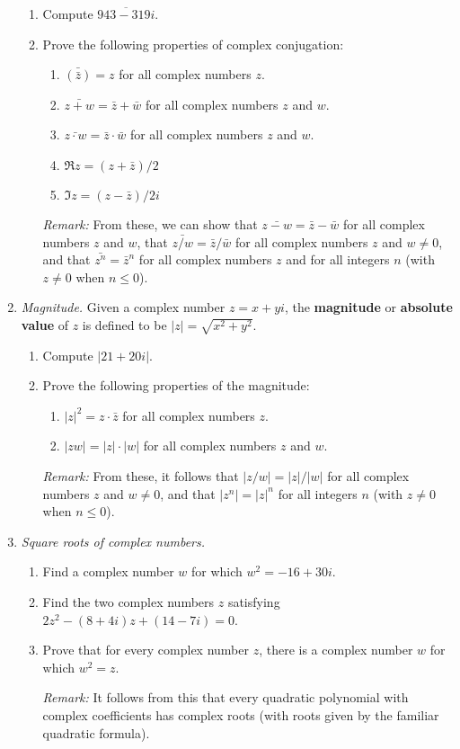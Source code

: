 \begin{enumerate}
\begin{enumerate}
\item Compute $\overline{943 - 319i}$.
\item Prove the following properties of complex conjugation:
\begin{enumerate}
\item $\bar{(\bar{z})} = z$ for all complex numbers $z$.
\item $\bar{z + w} = \bar{z} + \bar{w}$ for all complex numbers $z$ and $w$.
\item $\bar{z\cdot w} = \bar{z}\cdot\bar{w}$ for all complex numbers $z$ and $w$.
\item $\Re z = (z + \bar{z})/2$
\item $\Im z = (z - \bar{z})/2i$
\end{enumerate}
\emph{Remark:} From these, we can show that $\bar{z - w} = \bar{z} - \bar{w}$ for all complex numbers $z$ and $w$, that $\bar{z/w} = \bar{z}/\bar{w}$ for all complex numbers $z$ and $w\neq 0$, and that $\bar{z^n} = \bar{z}^n$ for all complex numbers $z$ and for all integers $n$ (with $z\neq 0$ when $n\leq 0$).
\end{enumerate}
\item \emph{Magnitude.} Given a complex number $z = x + yi$, the \textbf{magnitude} or \textbf{absolute value} of $z$ is defined to be $\lvert z\rvert = \sqrt{x^2 + y^2}$.
\begin{enumerate}
\item Compute $\lvert 21 + 20i\rvert$.
\item Prove the following properties of the magnitude:
\begin{enumerate}
\item $\lvert z\rvert^2 = z\cdot\bar{z}$ for all complex numbers $z$.
\item $\lvert zw\rvert = \lvert z\rvert\cdot\lvert w\rvert$ for all complex numbers $z$ and $w$.
\end{enumerate}
\emph{Remark:} From these, it follows that $\lvert z/w\rvert = \lvert z\rvert / \lvert w\rvert$ for all complex numbers $z$ and $w\neq 0$, and that $\lvert z^n\rvert = \lvert z\rvert^n$ for all integers $n$ (with $z\neq 0$ when $n\leq 0$).
\end{enumerate}
\item \emph{Square roots of complex numbers.}
\begin{enumerate}
\item Find a complex number $w$ for which $w^2 = -16 + 30i$.
\item Find the two complex numbers $z$ satisfying $2z^2 - (8 + 4i)z + (14 - 7i) = 0$.
\item Prove that for every complex number $z$, there is a complex number $w$ for which $w^2 = z$.\par
\emph{Remark:} It follows from this that every quadratic polynomial with complex coefficients has complex roots (with roots given by the familiar quadratic formula).
\end{enumerate}
\end{enumerate}




